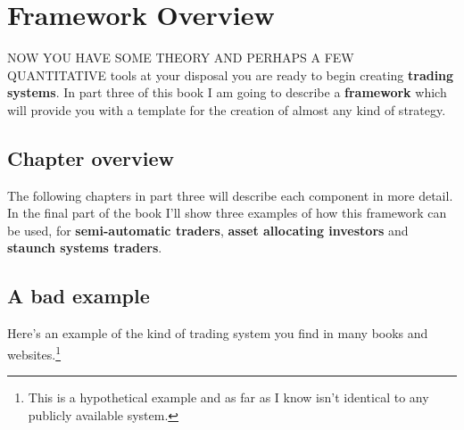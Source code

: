 \chapter{Framework Overview}

NOW YOU HAVE SOME THEORY AND PERHAPS A FEW QUANTITATIVE tools at your disposal you are ready to begin creating \textbf{trading systems}. In part three of this book I am going to describe a \textbf{framework} which will provide you with a template for the creation of almost any kind of strategy.

\section*{Chapter overview}  {}

\begin{chapteroverviewtable}
\end{chapteroverviewtable}

\medskip

\noindent The following chapters in part three will describe each component in more detail. In the final part of the book I'll show three examples of how this framework can be used, for \textbf{semi-automatic traders}, \textbf{asset allocating investors} and \textbf{staunch systems traders}.

\section*{A bad example}  {}

Here's an example of the kind of trading system you find in many books and websites.\footnote{This is a hypothetical example and as far as I know isn't identical to any publicly available system.}

